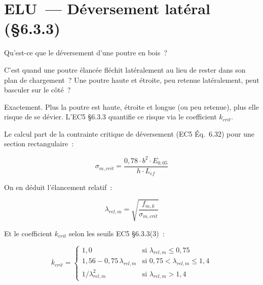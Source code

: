 \section{ELU~--- D\'eversement lat\'eral (\S{}6.3.3)}

\begin{maitre}
Qu'est-ce que le d\'eversement d'une poutre en bois~?
\end{maitre}

\begin{apprenti}
C'est quand une poutre \'elanc\'ee fl\'echit lat\'eralement au lieu de
rester dans son plan de chargement~? Une poutre haute et \'etroite,
peu retenue lat\'eralement, peut basculer sur le c\^ot\'e~?
\end{apprenti}

\begin{maitre}
Exactement. Plus la poutre est haute, \'etroite et longue (ou peu retenue),
plus elle risque de se d\'evier. L'EC5 \S{}6.3.3 quantifie ce risque
via le coefficient $k_{crit}$.
\end{maitre}

Le calcul part de la contrainte critique de d\'eversement
(EC5 \'Eq.~6.32) pour une section rectangulaire~:

\begin{equation}
\sigma_{m,crit} = \frac{0{,}78 \cdot b^2 \cdot E_{0,05}}{h \cdot L_{ef}}
\label{eq:sigmacrit}
\end{equation}

On en d\'eduit l'\'elancement relatif~:

\begin{equation}
\lambda_{rel,m} = \sqrt{\frac{f_{m,k}}{\sigma_{m,crit}}}
\label{eq:lambda}
\end{equation}

Et le coefficient $k_{crit}$ selon les seuils EC5 \S{}6.3.3(3)~:

\begin{equation}
k_{crit} = \begin{cases}
1{,}0 & \text{si } \lambda_{rel,m} \leq 0{,}75 \\
1{,}56 - 0{,}75 \, \lambda_{rel,m} & \text{si } 0{,}75 < \lambda_{rel,m} \leq 1{,}4 \\
1/\lambda_{rel,m}^2 & \text{si } \lambda_{rel,m} > 1{,}4
\end{cases}
\label{eq:kcrit}
\end{equation}


